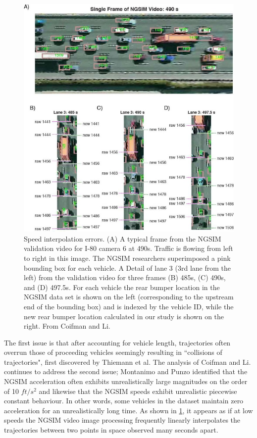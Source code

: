 \documentclass[11pt]{uonthesis}
\begin{document}
\begin{figure}[ht!]
    \centering
    \includegraphics[width=12cm]{images/interpolation.jpg}
    \caption{Speed interpolation errors. (A) A typical frame from the NGSIM validation video for I-80 camera 6 at 490s. Traffic is flowing from left to right in this image. The NGSIM researchers superimposed a pink bounding box for each vehicle. A Detail of lane 3 (3rd lane from the left) from the validation video for three frames (B) 485s, (C) 490s, and (D) 497.5s. For each vehicle the rear bumper location in the NGSIM data set is shown on the left (corresponding to the upstream end of the bounding box) and is indexed by the vehicle ID, while the new rear bumper location calculated in our study is shown on the right. From Coifman and Li. \protect\cite{COIFMAN2017362}}
    \label{fig:interpolation}
\end{figure}

The first issue is that after accounting for vehicle length, trajectories often overrun those of proceeding vehicles seemingly resulting in ``collisions of trajectories", first discovered by Thiemann et al. \cite{Thiemann_2008} The analysis of Coifman and Li. continues to address the second issue; Montanimo and Punzo \cite{MONTANINO201582} identified that the NGSIM acceleration often exhibits unrealistically large magnitudes on the order of 10 $ft/s^2$ and likewise that the NGSIM speeds exhibit unrealistic piecewise constant behaviour. In other words, some vehicles in the dataset maintain zero acceleration for an unrealistically long time. As shown in \ref{fig:interpolation}, %
it appears as if at low speeds the NGSIM video image processing frequently linearly interpolates the trajectories between two points in space observed many seconds apart.
\end{document}
